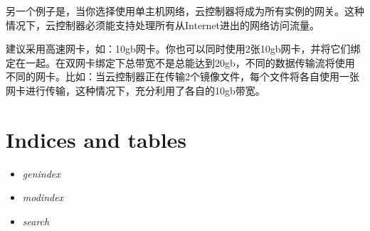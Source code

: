 \documentclass[letterpaper,10pt,english]{sphinxmanual}
\begin{document}
另一个例子是，当你选择使用单主机网络，云控制器将成为所有实例的网关。这种情况下，云控制器必须能支持处理所有从Internet进出的网络访问流量。

建议采用高速网卡，如：10gb网卡。你也可以同时使用2张10gb网卡，并将它们绑定在一起。在双网卡绑定下总带宽不是总能达到20gb，不同的数据传输流将使用不同的网卡。比如：当云控制器正在传输2个镜像文件，每个文件将各自使用一张网卡进行传输，这种情况下，充分利用了各自的10gb带宽。


\chapter{Indices and tables}
\label{index:indices-and-tables}\begin{itemize}
\item {} 
\emph{genindex}

\item {} 
\emph{modindex}

\item {} 
\emph{search}

\end{itemize}



\renewcommand{\indexname}{Index}
\printindex
\end{document}
